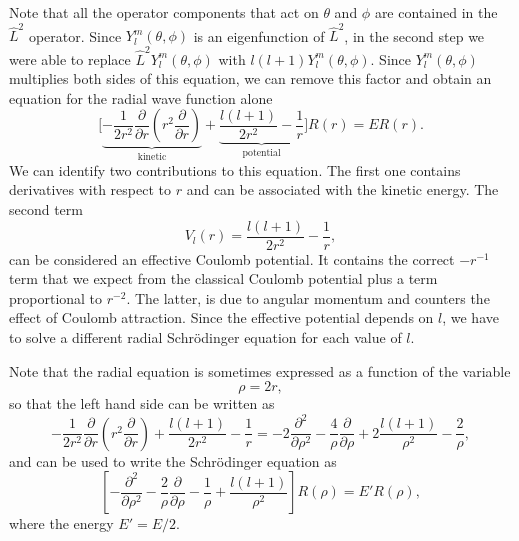 \documentclass[../Main/chem331-notes.tex]{subfiles}
\begin{document}
Note that all the operator components that act on $\theta$ and $\phi$ are contained in the $\hat{L}^2$ operator. Since $Y_l^m(\theta,\phi)$ is an eigenfunction of $\hat{L}^2$, in the second step we were able to replace $\hat{L}^2Y_l^m(\theta,\phi)$ with $l(l+1)Y_l^m(\theta,\phi)$.
Since $Y_l^m(\theta,\phi)$ multiplies both sides of this equation, we can remove this factor and obtain an equation for the radial wave function alone
\begin{equation}
\Big[\underbrace{
 -\frac{1}{2r^2} \frac{\partial}{\partial r} \left( r^2 \frac{\partial  }{\partial r} \right)
 }_{\text{kinetic}}
+ \underbrace{
\frac{l(l+1)}{2r^2} - \frac{1}{r}
}_{\text{potential}}
\Big] R(r) = E R(r).
\end{equation}
We can identify two contributions to this equation. The first one contains derivatives with respect to $r$ and can be associated with the kinetic energy.
The second term
 \begin{equation}
V_l(r) = \frac{l(l+1)}{2r^2} - \frac{1}{r},
\end{equation}
can be considered an effective Coulomb potential. It contains the correct $- r^{-1}$ term that we expect from the classical Coulomb potential plus a term proportional to $r^{-2}$.
The latter, is due to angular momentum and counters the effect of Coulomb attraction.
Since the effective potential depends on $l$, we have to solve a different radial Schr\"{o}dinger equation for each value of $l$.

Note that the radial equation is sometimes expressed as a function of the variable
\begin{equation}
\rho = 2r,
\end{equation}
so that the left hand side can be written as
\begin{equation}
-\frac{1}{2r^2} \frac{\partial}{\partial r} \left( r^2 \frac{\partial  }{\partial r} \right) + \frac{l(l+1)}{2r^2} - \frac{1}{r}
= -2 \frac{\partial^2}{\partial \rho^2}
-\frac{4}{\rho} \frac{\partial}{\partial \rho} + 2\frac{l(l+1)}{\rho^2} - \frac{2}{\rho},
\end{equation}
and can be used to write the Schr\"{o}dinger equation as
\begin{equation}
\left[
-\frac{\partial^2 }{\partial \rho^2}
-\frac{2}{\rho}\frac{\partial }{\partial \rho}
-\frac{1}{\rho} + \frac{l(l+1)}{\rho^2} \right] R(\rho) = E' R(\rho),
\end{equation}
where the energy $E' = E / 2$.
\end{document}

